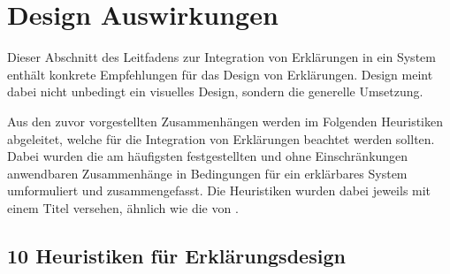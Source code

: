 \section{Design Auswirkungen}
\label{sec:model_design_implications}

Dieser Abschnitt des Leitfadens zur Integration von Erklärungen in ein System enthält konkrete Empfehlungen für das Design von Erklärungen. Design meint dabei nicht unbedingt ein visuelles Design, sondern die generelle Umsetzung.

Aus den zuvor vorgestellten Zusammenhängen werden im Folgenden Heuristiken abgeleitet, welche für die Integration von Erklärungen beachtet werden sollten. Dabei wurden die am häufigsten festgestellten und ohne Einschränkungen anwendbaren Zusammenhänge in Bedingungen für ein erklärbares System umformuliert und zusammengefasst. Die Heuristiken wurden dabei jeweils mit einem Titel versehen, ähnlich wie die  von \citeauthor{nielsen10usability} \cite{nielsen10usability}.


\subsection*{10 Heuristiken für Erklärungsdesign}

